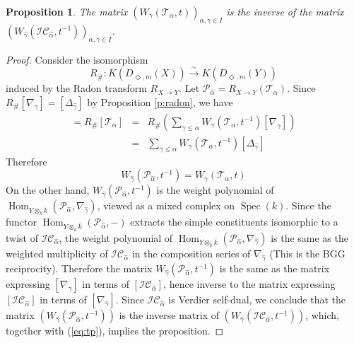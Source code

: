 \documentclass{amsart}
\theoremstyle{plain}
\newtheorem{prop}[subsubsection]{Proposition}
\theoremstyle{definition}
\theoremstyle{remark}
\numberwithin{equation}{subsection}
\begin{document}
\begin{prop}\label{p:tp}
The matrix $(W_{\gamma}({\mathcal{T}}_\alpha,t))_{\alpha,\gamma\in I}$ is the inverse of the matrix\newline $(W_{\hat{\gamma}}({\mathcal{IC}}_{\hat{\alpha}},t^{-1}))_{\alpha,\gamma\in I}$.
\end{prop}
\begin{proof}
Consider the isomorphism
\begin{equation*}
R_\#:K({D_{\Diamond,m}({X})})\stackrel{\sim}{\to} K({D_{\Diamond,m}({Y})})
\end{equation*}
induced by the Radon transform $R_{X\to Y}$. Let ${\mathcal{P}}_{\hat{\alpha}}=R_{X\to Y}({\mathcal{T}}_\alpha)$. Since $R_\#[\nabla_{\gamma}]=[\Delta_{\hat{\gamma}}]$ by Proposition \ref{p:radon}, we have
\begin{eqnarray*}
[{\mathcal{P}}_{\hat{\alpha}}]=R_\#[{\mathcal{T}}_\alpha]&=&R_\#\left(\sum_{\gamma\leq\alpha}W_\gamma({\mathcal{T}}_\alpha,t^{-1})[\nabla_\gamma]\right)\\
&=&\sum_{\gamma\leq\alpha}W_\gamma({\mathcal{T}}_\alpha,t^{-1})[\Delta_{\hat{\gamma}}]
\end{eqnarray*}
Therefore
\begin{equation}\label{eq:tp}
W_{\hat{\gamma}}({\mathcal{P}}_{\hat{\alpha}},t^{-1})=W_\gamma({\mathcal{T}}_\alpha,t)
\end{equation}
On the other hand, $W_{\hat{\gamma}}({\mathcal{P}}_{\hat{\alpha}},t^{-1})$ is the weight polynomial of $\operatorname{Hom}_{{{Y}\otimes_k\bar{k}}}({\mathcal{P}}_{\hat{\alpha}},\nabla_{\hat{\gamma}})$, viewed as a mixed complex on $\operatorname{Spec}(k)$. Since the functor $\operatorname{Hom}_{{{Y}\otimes_k\bar{k}}}({\mathcal{P}}_{\hat{\alpha}},-)$ extracts the simple constituents isomorphic to a twist of ${\mathcal{IC}}_{\hat{\alpha}}$, the weight polynomial of $\operatorname{Hom}_{{{Y}\otimes_k\bar{k}}}({\mathcal{P}}_{\hat{\alpha}},\nabla_{\hat{\gamma}})$ is the same as the weighted multiplicity of ${\mathcal{IC}}_{\hat{\alpha}}$ in the composition series of $\nabla_{\hat{\gamma}}$ (This is the BGG reciprocity). Therefore the matrix $W_{\hat{\gamma}}({\mathcal{P}}_{\hat{\alpha}},t^{-1})$ is the same as the matrix expressing $[\nabla_{\hat{\gamma}}]$ in terms of $[{\mathcal{IC}}_{\hat{\alpha}}]$, hence inverse to the matrix expressing $[{\mathcal{IC}}_{\hat{\alpha}}]$ in terms of $[\nabla_{\hat{\gamma}}]$. Since ${\mathcal{IC}}_{\hat{\alpha}}$ is Verdier self-dual, we conclude that the matrix $(W_{\hat{\gamma}}({\mathcal{P}}_{\hat{\alpha}},t^{-1}))$ is the inverse matrix of $(W_{\hat{\gamma}}({\mathcal{IC}}_{\hat{\alpha}},t^{-1}))$, which, together with (\ref{eq:tp}), implies the proposition.
\end{proof}
\end{document}

